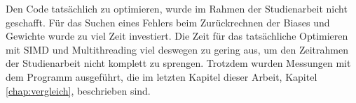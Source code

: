 \documentclass[../main.tex]{subfiles}
\begin{document}
Den Code tatsächlich zu optimieren, wurde im Rahmen der Studienarbeit nicht geschafft. Für das Suchen eines Fehlers beim Zurückrechnen der Biases und Gewichte wurde zu viel Zeit investiert. Die Zeit für das tatsächliche Optimieren mit SIMD und Multithreading viel deswegen zu gering aus, um den Zeitrahmen der Studienarbeit nicht komplett zu sprengen.
Trotzdem wurden Messungen mit dem Programm ausgeführt, die im letzten Kapitel dieser Arbeit, Kapitel \ref{chap:vergleich}, beschrieben sind.
\end{document}
